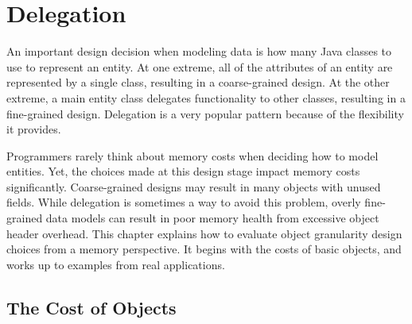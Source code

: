 \documentclass{book}
\theoremstyle{definition}
\begin{document}
\chapter{Delegation}

An important design decision when modeling data is how many Java classes to use to represent an entity. At one extreme, all of the attributes of an entity are represented by a single class, resulting in a coarse-grained design. At the other extreme, a main entity class delegates functionality to other classes, resulting in a fine-grained design.  Delegation is a very popular pattern because of the flexibility it provides. 

Programmers rarely think about memory costs when deciding how to model entities. Yet, the choices made at this design stage impact memory costs significantly. Coarse-grained designs may result in many objects with unused fields. While delegation is sometimes a way to avoid this problem, overly fine-grained data models can result in poor memory health from excessive object header overhead. This chapter explains how to evaluate object granularity design choices from a memory perspective. It begins with the costs of basic objects, and works up to examples from real applications.
  
\section{The Cost of Objects}
\label{sec:CostOfObjects}
\end{document}
